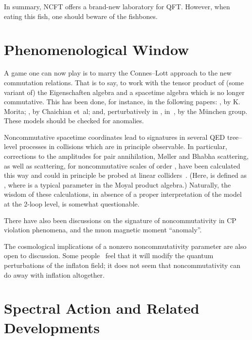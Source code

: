 \documentclass[a4paper,12pt]{article}
\providecommand{\ga}{\gamma}            %
\providecommand{\La}{\Lambda}           %
\DeclareMathOperator{\TeV}{TeV}     %
\providecommand{\1}{\mathbf{1}}         %
\providecommand{\7}{\dagger}            %
\providecommand{\8}{\bullet}            %
\renewcommand{\.}{\cdot}            %
\renewcommand{\:}{\colon}           %
\begin{document}
In summary, NCFT offers a brand-new laboratory for QFT. However, when 
eating this fish, one should beware of the fishbones.



\section{Phenomenological Window}

A game one can now play is to marry the Connes--Lott approach to the
new commutation relations. That is to say, to work with the tensor
product of (some variant of) the Eigenschaften algebra and a spacetime
algebra which is no longer commutative. This has been done, for
instance, in the following papers: \cite{Morita}, by K. Morita;
\cite{ChaichianPJTModel}, by Chaichian et~al; and, perturbatively in
\myHighlight{$\theta$}\coordHE{}, in~\cite{CalmetJSWW}, by the M\"unchen group. These models
should be checked for anomalies.

Noncommutative spacetime coordinates lead to signatures in several
\coordHE{} QED tree--level processes in \coordHE{} collisions which are
in principle observable. In particular, corrections to the amplitudes
for pair annihilation, M{\o}ller and Bhabha scattering, as well as
\myHighlight{$\ga\ga \to \ga\ga$}\coordHE{} scattering, for noncommutative scales
\myHighlight{$\La_{\rm NC}$}\coordHE{} of order \myHighlight{$\geq 1 \TeV$}\coordHE{}, have been calculated this way
and could in principle be probed at linear colliders~\cite{Hewett}.
(Here, \myHighlight{$\La_{\rm NC}$}\coordHE{} is defined as \coordHE{}, where \myHighlight{$\theta$}\coordHE{}
is a typical parameter in the Moyal product algebra.) Naturally, the
wisdom of these calculations, in absence of a proper interpretation of
the model at the 2-loop level, is somewhat questionable.

There have also been discussions on the signature of noncommutativity
in CP violation phenomena, and the muon magnetic moment ``anomaly''.

The cosmological implications of a nonzero noncommutativity parameter
are also open to discussion. Some people~\cite{ChuGS,LizziMMP} feel
that it will modify the quantum perturbations of the inflaton field;
it does not seem that noncommutativity can do away with inflation
altogether.


\section{Spectral Action and Related Developments}
\end{document}
